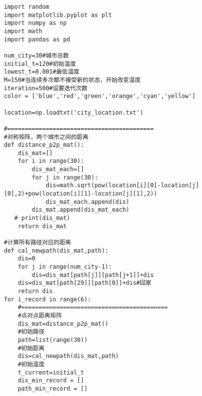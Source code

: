 \begin{lstlisting}
import random
import matplotlib.pyplot as plt
import numpy as np
import math
import pandas as pd

num_city=30#城市总数
initial_t=120#初始温度
lowest_t=0.001#最低温度
M=150#当连续多次都不接受新的状态，开始改变温度
iteration=500#设置迭代次数
color = ['blue','red','green','orange','cyan','yellow']

location=np.loadtxt('city_location.txt')

#==========================================
#对称矩阵，两个城市之间的距离
def distance_p2p_mat():
    dis_mat=[]
    for i in range(30):
        dis_mat_each=[]
        for j in range(30):
            dis=math.sqrt(pow(location[i][0]-location[j][0],2)+pow(location[i][1]-location[j][1],2))
            dis_mat_each.append(dis)
        dis_mat.append(dis_mat_each)
   # print(dis_mat)
    return dis_mat

#计算所有路径对应的距离
def cal_newpath(dis_mat,path):
    dis=0
    for j in range(num_city-1):
        dis=dis_mat[path[j]][path[j+1]]+dis
    dis=dis_mat[path[29]][path[0]]+dis#回家
    return dis
for i_record in range(6):
    #==========================================
    #点对点距离矩阵
    dis_mat=distance_p2p_mat()
    #初始路径
    path=list(range(30))
    #初始距离
    dis=cal_newpath(dis_mat,path)
    #初始温度
    t_current=initial_t
    dis_min_record = []
    path_min_record = []


\end{lstlisting}
